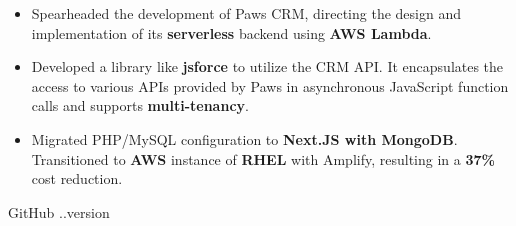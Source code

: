\documentclass[10pt,a4paper,ragged2e]{classes/altacv}
\begin{document}
\begin{itemize}[itemsep=6pt]
\normalsize
\item Spearheaded the development of Paws CRM, directing the design and implementation of its \textbf{serverless} backend using \textbf{AWS Lambda}.
\item Developed a library like \textbf{jsforce} to utilize the CRM API. It encapsulates the access to various APIs provided by Paws in asynchronous JavaScript function calls and supports \textbf{multi-tenancy}.
\end{itemize}
\vspace{6pt}
\begin{itemize}[itemsep=6pt]
\normalsize
\item Migrated PHP/MySQL configuration to \textbf{Next.JS with MongoDB}. Transitioned to \textbf{AWS} instance of \textbf{RHEL} with
Amplify, resulting in a \textbf{37\%} cost reduction.
\end{itemize}

\smallskip
\begin{footnotesize}
GitHub \number \month .\number\year.version
\end{footnotesize}
\clearpage
\end{document}
